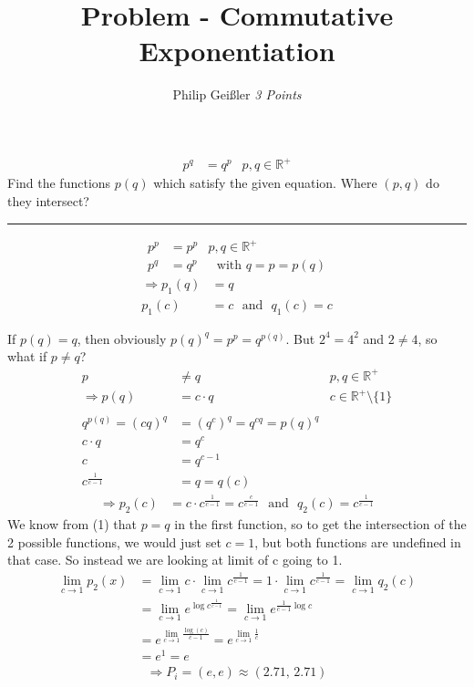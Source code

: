 \documentclass[12pt, a4paper]{article}
\newcommand{\rom}[1]{\uppercase\expandafter{\romannumeral #1\relax}}
\begin{document}
\title{Problem \rom{1} - Commutative Exponentiation}
\author{Philip Gei\ss{}ler \hspace{5cm} \textit{3 Points}}
\date{}
\maketitle
\vspace*{-.9cm}

\begin{align*}
p^q &= q^p & p,q\in\mathbb{R}^+
\end{align*}
Find the functions $p(q)$ which satisfy the given equation. Where $(p,q)$ do they intersect?
\hrule
\vspace*{9mm}

\begin{align*}
p^p &= p^p & p,q\in\mathbb{R}^+\\
p^q &= q^p &\text{~~with~} q = p = p(q)
\end{align*}
\vspace*{-1cm}
\begin{align}
\Rightarrow p_1(q) &= q\\
p_1(c) &= c \text{~~and~~} q_1(c) = c
\end{align}

If $p(q)=q$, then obviously $p(q)^q = p^p = q^{p(q)}$.
But $2^4 = 4^2$ and $2 \neq 4$, so what if $p \neq q$?
\begin{align*}
p &\neq q & p,q\in\mathbb{R}^+\\
\Rightarrow p(q) &= c\cdot q & c\in \mathbb{R}^+\setminus\{{1}\}\\~\\
q^{p(q)} = (cq)^q &= \left(q^c\right)^q= q^{cq} = p(q)^q\\
c\cdot q &= q^c\\
c &= q^{c-1}\\
c^\frac{1}{c-1} &= q = q(c)
\end{align*}
\vspace*{-1cm}
\begin{align}
\Rightarrow p_2(c) &= c\cdot c^\frac{1}{c-1} = c^\frac{c}{c-1}\text{~~and~~} q_2(c) = c^\frac{1}{c-1}
\end{align} 
We know from (1) that $p=q$ in the first function, so to get the intersection of the 2 possible functions, we would just set $c=1$, but both functions are undefined in that case. So instead we are looking at limit of c going to 1. 
\begin{align*}
\lim_{c\rightarrow 1} p_2(x) &= \lim_{c\rightarrow 1} c\cdot \lim_{c\rightarrow 1} c^\frac{1}{c-1} = 1 \cdot \lim_{c\rightarrow 1} c^\frac{1}{c-1} = \lim_{c\rightarrow 1} q_2(c)\\
& = \lim_{c\rightarrow 1} e^{\log{c^\frac{1}{c-1}}} = \lim_{c\rightarrow 1} e^{\frac{1}{c-1}\log{c}}\\
 &= e^{\lim\limits_{c\rightarrow 1} \frac{\log(c)}{c-1}} = e^{\lim\limits_{c\rightarrow 1} \frac{1}{c}}\\
 &= e^1 = e
\end{align*}
\begin{align}
\Rightarrow P_i = (e,e) \approx (2.71,\,2.71)
\end{align}
\end{document}
